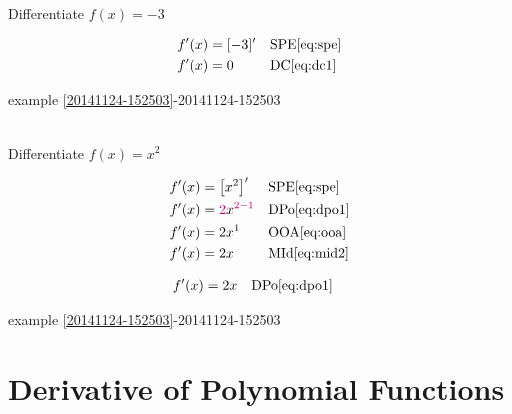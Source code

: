 \documentclass[20150903-160354-rs2.2-MarksMathNotebook.tex]{subfiles}
\begin{document}
\begin{example}[id:20141124-153017] \label{20141124-153017} \hfill \\

Differentiate $f(x)=-3$

\soln

\solnsteps
\begin{align*}
f'(x) &= [-3]' && \text{SPE} \eqref{eq:spe} \\
f'(x) &= 0 && \text{DC} \eqref{eq:dc1}
\end{align*}

\qdepend

\qdependlist

example \ref{20141124-152503}-20141124-152503


\end{example}


\begin{example}[id:20141124-141850] \label{20141124-141850} \hfill \\

Differentiate $f(x)=x^2$

\soln

\solnsteps
\begin{align*}
f'(x) &= \left[x^2\right]' && \text{SPE} \eqref{eq:spe} \\
f'(x) &= \cRed{2}x^{\cRed{2-1}} && \text{DPo} \eqref{eq:dpo1} \\
f'(x) &= 2x^1 && \text{OOA} \eqref{eq:ooa} \\
f'(x) &= 2x && \text{MId} \eqref{eq:mid2}
\end{align*}

\soln

\lesssteps
\begin{align*}
f'(x) & = 2x && \text{DPo} \eqref{eq:dpo1}
\end{align*}

\qdepend

\qdependlist

example \ref{20141124-152503}-20141124-152503



\end{example}

\section{Derivative of Polynomial Functions}
\end{document}

